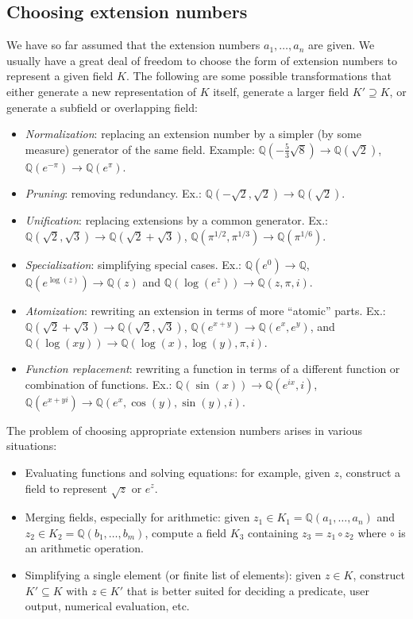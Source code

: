 \documentclass[11pt,a4paper]{article}
\begin{document}
\subsection{Choosing extension numbers}

We have so far assumed that the extension numbers $a_1,\ldots,a_n$
are given. We usually have a great deal of freedom to
choose the form of extension numbers to represent a given field $K$. The following are some possible
transformations that either generate a new representation of $K$ itself,
generate a larger field $K' \supseteq K$, or generate a subfield or overlapping field:

\begin{itemize}
\item \emph{Normalization}: replacing an extension number by a simpler (by some measure) generator of the same field.  Example: $\mathbb{Q}(-\tfrac{5}{3}\sqrt{8}) \to \mathbb{Q}(\sqrt{2})$, $\mathbb{Q}(e^{-\pi}) \to \mathbb{Q}(e^{\pi})$.
\item \emph{Pruning}: removing redundancy. Ex.: $\mathbb{Q}(-\sqrt{2},\sqrt{2}) \to \mathbb{Q}(\sqrt{2})$.
\item \emph{Unification}: replacing extensions by a common generator. Ex.: $\mathbb{Q}(\sqrt{2},\sqrt{3}) \to \mathbb{Q}(\sqrt{2}+\sqrt{3})$, $\mathbb{Q}(\pi^{1/2}, \pi^{1/3}) \to \mathbb{Q}(\pi^{1/6})$.
\item \emph{Specialization}: simplifying special cases. Ex.: $\mathbb{Q}(e^0) \to \mathbb{Q}$, $\mathbb{Q}(e^{\log(z)}) \to \mathbb{Q}(z)$ and $\mathbb{Q}(\log(e^z)) \to \mathbb{Q}(z, \pi, i)$.
\item \emph{Atomization}: rewriting an extension in terms of more ``atomic'' parts. Ex.: $\mathbb{Q}(\sqrt{2}+\sqrt{3}) \to \mathbb{Q}(\sqrt{2},\sqrt{3})$,
$\mathbb{Q}(e^{x+y}) \to \mathbb{Q}(e^x, e^y)$, and $\mathbb{Q}(\log(xy)) \to \mathbb{Q}(\log(x), \log(y), \pi, i)$.
\item \emph{Function replacement}: rewriting a function in terms of a different function or combination of functions. Ex.: $\mathbb{Q}(\sin(x)) \to \mathbb{Q}(e^{ix}, i)$, $\mathbb{Q}(e^{x+yi}) \to \mathbb{Q}(e^x, \cos(y), \sin(y), i)$.
\end{itemize}

The problem of choosing appropriate extension numbers arises in various situations:

\begin{itemize}
\item Evaluating functions and solving equations: for example, given $z$, construct a field to represent $\sqrt{z}$ or $e^z$.
\item Merging fields, especially for arithmetic: given $z_1 \in K_1 = \mathbb{Q}(a_1,\ldots,a_n)$ and $z_2 \in K_2 = \mathbb{Q}(b_1,\ldots,b_m)$, compute a field $K_3$ containing $z_3 = z_1 \circ z_2$ where $\circ$ is an arithmetic operation.
\item Simplifying a single element (or finite list of elements): given $z \in K$, construct $K' \subseteq K$ with $z \in K'$ that is better suited for deciding a predicate, user output, numerical evaluation, etc.
\end{itemize}
\end{document}
